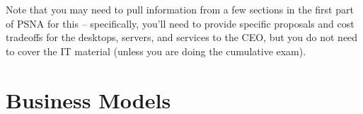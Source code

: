 \documentclass{exam}
\begin{document}
\begin{questions}
Note that you may need to pull information from a few sections in the
first part of PSNA for this -- specifically, you'll need to provide
specific proposals and cost tradeoffs for the desktops, servers, and 
services to the CEO, but
you do not need to cover the IT material (unless you are doing the 
cumulative exam).  

\section*{Business Models}
\begin{comment}
\begin{enumerate}
\item Large company with 5000 employees on a 3-building campus handling 
  the back-end of an
  e-commerce site.  There is an in-house development team of 10 developers,
  and the full-time, permanant IT staff for internal needs should have no 
  more than an additional 20 people.  You do not need to consider
  the Help Desk for external users.  Note that each person in the
  company has a desktop PC.  There are 4 servers for development, and
  4 servers for production use by the e-commerce site.  
  Other servers (and services) need to  be specified by you.
\item Small engineering company with 200 employees, 150 of which are
  developers (on both Windows and Unix platforms), 30 of which are 
  sales \& marketing, with the final
  20 being management.  The company is heavily influenced by Extreme
  Programming and has broken up the developers into 20 small 
  departments with very differing needs.  You will need to make a 
  recommendation for the
  size of the IT team in addition to the other requirements.  Each
  engineer has 2 machines on her desk: one running Windows and one
  running either Solaris, FreeBSD, or Linux (you can assume roughly
  $1/3$ are running each platform).  
\item Small university of 1000 students, 50 faculty, and 
  20 administrative staff (including 5 IT).  Each faculty and staff
  member has a desktop PC, but no students have individual machines: they
  share the use of 4 labs with 50 machines each that are open 24 hours.
  
\end{enumerate}
\end{comment}


\end{questions}
\end{document}
